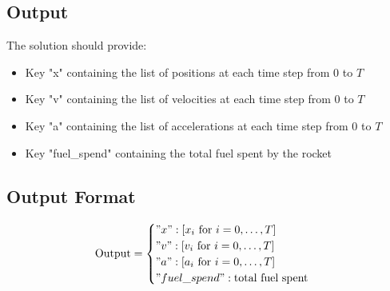 \documentclass{article}
\begin{document}
\subsection*{Output}
The solution should provide:
\begin{itemize}
    \item Key "x" containing the list of positions at each time step from \( 0 \) to \( T \)
    \item Key "v" containing the list of velocities at each time step from \( 0 \) to \( T \)
    \item Key "a" containing the list of accelerations at each time step from \( 0 \) to \( T \)
    \item Key "fuel\_spend" containing the total fuel spent by the rocket
\end{itemize}

\subsection*{Output Format}
\[
\text{{Output}} = 
\begin{cases}
    "x": [x_i \text{ for } i = 0, \ldots, T] \\
    "v": [v_i \text{ for } i = 0, \ldots, T] \\
    "a": [a_i \text{ for } i = 0, \ldots, T] \\
    "fuel\_spend": \text{total fuel spent}
\end{cases}
\]
\end{document}
